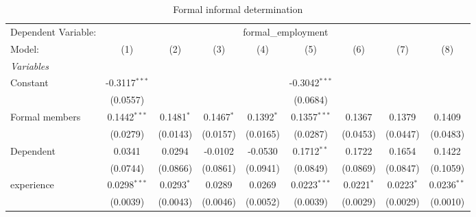 
\begin{table}[htbp]
   \caption{Formal informal determination}
   \centering
   \begin{tabular}{lcccccccc}
      \tabularnewline \midrule \midrule
      Dependent Variable: & \multicolumn{8}{c}{formal\_employment}\\
      Model:                    & (1)                     & (2)                     & (3)                     & (4)                    & (5)                     & (6)                     & (7)                     & (8)\\  
      \midrule
      \emph{Variables}\\
      Constant                  & -0.3117$^{***}$         &                         &                         &                        & -0.3042$^{***}$         &                         &                         &   \\   
                                & (0.0557)                &                         &                         &                        & (0.0684)                &                         &                         &   \\   
      Formal members            & 0.1442$^{***}$          & 0.1481$^{*}$            & 0.1467$^{*}$            & 0.1392$^{*}$           & 0.1357$^{***}$          & 0.1367                  & 0.1379                  & 0.1409\\   
                                & (0.0279)                & (0.0143)                & (0.0157)                & (0.0165)               & (0.0287)                & (0.0453)                & (0.0447)                & (0.0483)\\   
      Dependent                 & 0.0341                  & 0.0294                  & -0.0102                 & -0.0530                & 0.1712$^{**}$           & 0.1722                  & 0.1654                  & 0.1422\\   
                                & (0.0744)                & (0.0866)                & (0.0861)                & (0.0941)               & (0.0849)                & (0.0869)                & (0.0847)                & (0.1059)\\   
      experience                & 0.0298$^{***}$          & 0.0293$^{*}$            & 0.0289                  & 0.0269                 & 0.0223$^{***}$          & 0.0221$^{*}$            & 0.0223$^{*}$            & 0.0236$^{**}$\\   
                                & (0.0039)                & (0.0043)                & (0.0046)                & (0.0052)               & (0.0039)                & (0.0029)                & (0.0029)                & (0.0010)\\   

\end{tabular}
\end{table}
